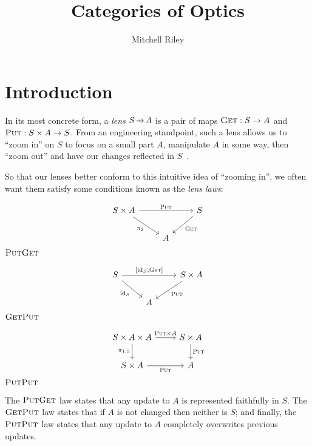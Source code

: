 \documentclass[11pt,letterpaper]{article}
\title{Categories of Optics}
\author{Mitchell Riley}
\affil{Wesleyan University \\ \texttt{mvriley@wesleyan.edu}}
\theoremstyle{plain}
\theoremstyle{definition}
\newcommand{\id}{\mathrm{id}}
\newcommand{\fget}{\textsc{Get}}
\newcommand{\fput}{\textsc{Put}}
\newcommand{\hto}{\ensuremath{\,\mathaccent\shortmid\rightarrow\,}}
\begin{document}
\maketitle

\section{Introduction}

In its most concrete form, a \emph{lens} $S \hto A$ is a pair of maps ${\fget : S \to A}$ and ${\fput : S \times A \to S}$. From an engineering standpoint, such a lens allows us to ``zoom in'' on $S$ to focus on a small part $A$, manipulate $A$ in some way, then ``zoom out'' and have our changes reflected in $S$~\cite{CombinatorsForBidirectionalTreeTransformations}.

So that our lenses better conform to this intuitive idea of ``zooming in'', we often want them satisfy some conditions known as the \emph{lens laws}:
\begin{center}
\begin{minipage}[b]{0.33333\textwidth}
\begin{center}
\[
\begin{tikzcd}
S \times A \ar[rr, "\fput"] \ar[dr, "\pi_2", swap] && S \ar[dl, "\fget"] \\
& A
\end{tikzcd}
\]
\hspace{0.8cm}$\fput\fget$
\end{center}
\end{minipage}%
\begin{minipage}[b]{0.33333\textwidth}
\begin{center}
\[
\begin{tikzcd}
S \ar[rr, "{[\id_S, \fget]}"] \ar[dr, "\id_S", swap] && S \times A \ar[dl, "\fput"] \\
& A
\end{tikzcd}
\]
\hspace{-0.6cm}$\fget\fput$
\end{center}
\end{minipage}%
\begin{minipage}[b]{0.33333\textwidth}
\begin{center}
\[
\begin{tikzcd}
S \times A \times A \ar[r, "\fput \times A"] \ar[d, "\pi_{1, 3}", swap] & S \times A\ar[d, "\fput"] \\
S \times A \ar[r, "\fput", swap] & A
\end{tikzcd}
\]
\quad$\fput\fput$
\end{center}
\end{minipage}%
\end{center}
The $\fput\fget$ law states that any update to $A$ is represented faithfully in $S$. The $\fget\fput$ law states that if $A$ is not changed then neither is $S$; and finally, the $\fput\fput$ law states that any update to $A$ completely overwrites previous updates.
\end{document}

